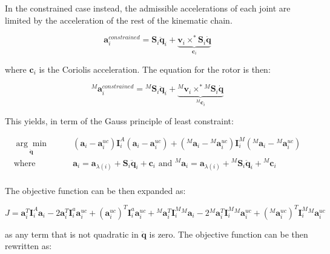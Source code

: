 In the constrained case instead, the admissible accelerations of each joint are limited by the acceleration of the rest of the kinematic chain.


\begin{equation}
    \mathbf{a} ^{constrained} _i = \mathbf{S} _i \ddot{\mathbf{q}} _i + \underbrace{\mathbf{v} _i \times ^* \mathbf{S} _i \dot{\mathbf{q}}} _{\mathbf{c} _i}
\end{equation}

where $\mathbf{c} _i$ is the Coriolis acceleration. The equation for the rotor is then:

\begin{equation}
    {} ^M \mathbf{a} ^{constrained} _i = {} ^M \mathbf{S} _i \ddot{\mathbf{q}} _i + \underbrace{{} ^M \mathbf{v} _i \times ^* {} ^M\mathbf{S} _i \dot{\mathbf{q}}} _{{} ^M \mathbf{c} _i}
\end{equation}

This yields, in term of the Gauss principle of least constraint:

\begin{align}
    \underset{\ddot{\mathbf{q}}}{\arg \min} & \qquad (\mathbf{a} _i - \mathbf{a} _i ^{uc}) \mathbf{I} ^A _i (\mathbf{a} _i - \mathbf{a} _i ^{uc}) + ({} ^M \mathbf{a} _i - {} ^M \mathbf{a} _i ^{uc}) \mathbf{I} ^M _i ({} ^M \mathbf{a} _i - {} ^M \mathbf{a} _i ^{uc}) \nonumber           \\
    \text{where }                           & \qquad \mathbf{a} _i = \mathbf{a} _{\lambda (i)} + \mathbf{S} _i \ddot{\mathbf{q}} _i + \mathbf{c} _i \text{ and } {} ^M \mathbf{a} _i = \mathbf{a} _{\lambda (i)} + {} ^M  \mathbf{S} _i \ddot{\mathbf{q}} _i + {} ^M \mathbf{c} _i \nonumber \\
\end{align}

The objective function can be then expanded as:

\begin{equation}
    J = \mathbf{a} ^T _i \mathbf{I} ^A _i \mathbf{a} _i - 2\mathbf{a} ^T _i \mathbf{I} ^a _i \mathbf{a} ^{uc} _i + (\mathbf{a} ^{uc} _i) ^T \mathbf{I} ^a _i \mathbf{a} ^{uc} _i + {} ^M \mathbf{a} ^T _i \mathbf{I} ^M _i {} ^M \mathbf{a} _i - 2 {} ^M \mathbf{a} ^T _i \mathbf{I} ^M _i {} ^M \mathbf{a} ^{uc} _i + ({} ^M \mathbf{a} ^{uc} _i) ^T \mathbf{I} ^M _i {} ^M \mathbf{a} ^{uc} _i
\end{equation}

as any term that is not quadratic in $\ddot{\mathbf{q}}$ is zero. The objective function can be then rewritten as:

